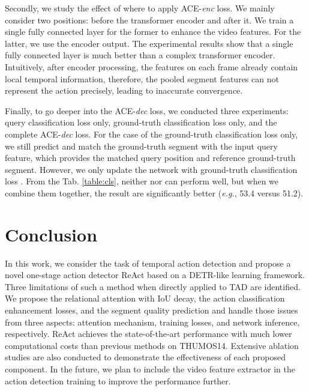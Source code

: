 \documentclass[runningheads]{llncs}
\def\eg{{\em e.g.}}
\newcommand{\tabref}[1]{Tab. \ref{#1}}
\def\name{ReAct }
\begin{document}
Secondly, we study the effect of where to apply ACE-\emph{enc} loss. We mainly consider two positions: before the transformer encoder and after it. We train a single fully connected layer for the former to enhance the video features. For the latter, we use the encoder output. The experimental results show that a single fully connected layer is much better than a complex transformer encoder. Intuitively, after encoder processing, the features on each frame already contain local temporal information, therefore, the pooled segment features can not represent the action precisely, leading to inaccurate convergence.

Finally, to go deeper into the ACE-\emph{dec} loss, we conducted three experiments: query classification loss only, ground-truth classification loss only, and the complete ACE-\emph{dec} loss. For the case of the ground-truth classification loss only, we still predict and match the ground-truth segment with the input query feature, which provides the matched query position and reference ground-truth segment. However, we only update the network with ground-truth classification loss . From the \tabref{table:cls}, neither  nor  can perform well, but when we combine them together, the result are significantly better (\eg, 53.4 versus 51.2). 













\section{Conclusion}
In this work, we consider the task of temporal action detection and propose a novel one-stage action detector \name based on a DETR-like learning framework. Three limitations of such a method when directly applied to TAD are identified. We propose the relational attention with IoU decay, the action classification enhancement losses, and the segment quality prediction and handle those issues from three aspects: attention mechanism, training losses, and network inference, respectively. \name achieves the state-of-the-art performance with much lower computational costs than previous methods on THUMOS14. Extensive ablation studies are also conducted to demonstrate the effectiveness of each proposed component. In the future, we plan to include the video feature extractor in the action detection training to improve the performance further. 
\end{document}
